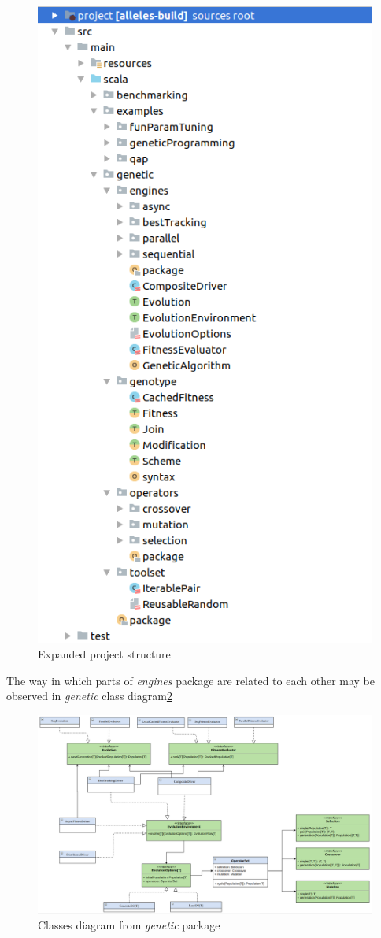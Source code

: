 \begin{figure}
\includegraphics[width=.7\textwidth]{img/diagrams/alleles-project-structure}
\caption{Expanded project structure}\label{diag:project-structure}
\end{figure}

\medbreak
The way in which parts of \textit{engines} package are related to each other may be observed in \textit{genetic} class diagram\ref{diag:genetic-classes}

\begin{figure}
\centering\includegraphics[width=1.\textwidth]{img/diagrams/alleles-genetic-class}
\caption{Classes diagram from \textit{genetic} package}\label{diag:genetic-classes}
\end{figure}